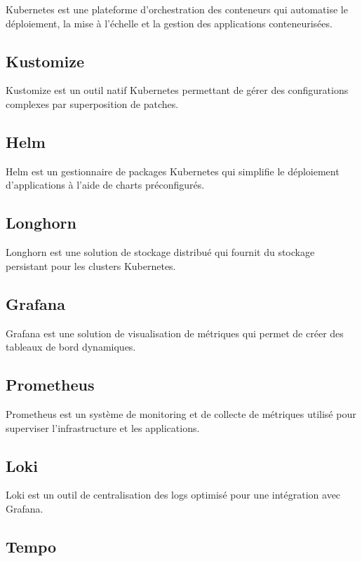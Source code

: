 Kubernetes est une plateforme d’orchestration des conteneurs qui automatise le déploiement, la mise à l’échelle et la gestion des applications conteneurisées.

\subsection{Kustomize}

Kustomize est un outil natif Kubernetes permettant de gérer des configurations complexes par superposition de patches.

\subsection{Helm}

Helm est un gestionnaire de packages Kubernetes qui simplifie le déploiement d’applications à l’aide de charts préconfigurés.

\subsection{Longhorn}

Longhorn est une solution de stockage distribué qui fournit du stockage persistant pour les clusters Kubernetes.

\subsection{Grafana}

Grafana est une solution de visualisation de métriques qui permet de créer des tableaux de bord dynamiques.

\subsection{Prometheus}

Prometheus est un système de monitoring et de collecte de métriques utilisé pour superviser l’infrastructure et les applications.

\subsection{Loki}

Loki est un outil de centralisation des logs optimisé pour une intégration avec Grafana.

\subsection{Tempo}

